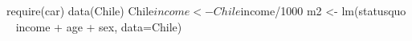 \begin{Schunk}
\begin{Sinput}
 require(car)
 data(Chile)
 Chile$income <- Chile$income/1000
 m2 <- lm(statusquo ~ income + age + sex, data=Chile)
\end{Sinput}
\end{Schunk}
